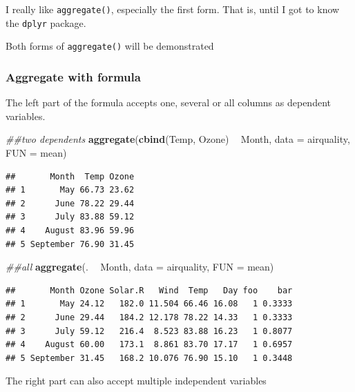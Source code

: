 \documentclass[]{book}
\newenvironment{Shaded}{\begin{snugshade}}{\end{snugshade}}
\newcommand{\CommentTok}[1]{\textcolor[rgb]{0.56,0.35,0.01}{\textit{#1}}}
\newcommand{\DataTypeTok}[1]{\textcolor[rgb]{0.13,0.29,0.53}{#1}}
\newcommand{\KeywordTok}[1]{\textcolor[rgb]{0.13,0.29,0.53}{\textbf{#1}}}
\newcommand{\NormalTok}[1]{#1}
\newcommand{\OperatorTok}[1]{\textcolor[rgb]{0.81,0.36,0.00}{\textbf{#1}}}
\newcommand{\StringTok}[1]{\textcolor[rgb]{0.31,0.60,0.02}{#1}}
\begin{document}
I really like \texttt{aggregate()}, especially the first form. That is, until I got to know the \texttt{dplyr} package.

Both forms of \texttt{aggregate()} will be demonstrated

\hypertarget{aggregate-with-formula}{%
\subsubsection*{Aggregate with formula}\label{aggregate-with-formula}}

The left part of the formula accepts one, several or all columns as dependent variables.

\begin{Shaded}
\begin{Highlighting}[]
\CommentTok{##two dependents}
\KeywordTok{aggregate}\NormalTok{(}\KeywordTok{cbind}\NormalTok{(Temp, Ozone) }\OperatorTok{~}\StringTok{ }\NormalTok{Month, }\DataTypeTok{data =}\NormalTok{ airquality, }\DataTypeTok{FUN =}\NormalTok{ mean)}
\end{Highlighting}
\end{Shaded}

\begin{verbatim}
##       Month  Temp Ozone
## 1       May 66.73 23.62
## 2      June 78.22 29.44
## 3      July 83.88 59.12
## 4    August 83.96 59.96
## 5 September 76.90 31.45
\end{verbatim}

\begin{Shaded}
\begin{Highlighting}[]
\CommentTok{##all}
\KeywordTok{aggregate}\NormalTok{(. }\OperatorTok{~}\StringTok{ }\NormalTok{Month, }\DataTypeTok{data =}\NormalTok{ airquality, }\DataTypeTok{FUN =}\NormalTok{ mean)}
\end{Highlighting}
\end{Shaded}

\begin{verbatim}
##       Month Ozone Solar.R   Wind  Temp   Day foo    bar
## 1       May 24.12   182.0 11.504 66.46 16.08   1 0.3333
## 2      June 29.44   184.2 12.178 78.22 14.33   1 0.3333
## 3      July 59.12   216.4  8.523 83.88 16.23   1 0.8077
## 4    August 60.00   173.1  8.861 83.70 17.17   1 0.6957
## 5 September 31.45   168.2 10.076 76.90 15.10   1 0.3448
\end{verbatim}

The right part can also accept multiple independent variables
\end{document}
